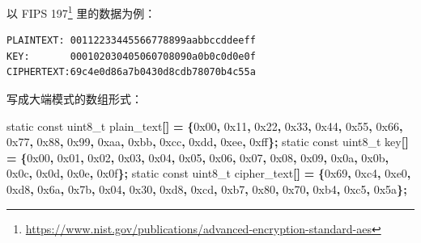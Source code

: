 \documentclass[
  12pt,
]{book}
\newenvironment{Shaded}{\begin{snugshade}}{\end{snugshade}}
\newcommand{\BaseNTok}[1]{\textcolor[rgb]{0.00,0.00,0.81}{#1}}
\newcommand{\DataTypeTok}[1]{\textcolor[rgb]{0.13,0.29,0.53}{#1}}
\newcommand{\NormalTok}[1]{#1}
\newcommand{\OperatorTok}[1]{\textcolor[rgb]{0.81,0.36,0.00}{\textbf{#1}}}
\renewcommand{\href}[2]{#2\footnote{\url{#1}}}
\begin{document}
以 \href{https://www.nist.gov/publications/advanced-encryption-standard-aes}{FIPS 197}
里的数据为例：

\begin{verbatim}
PLAINTEXT: 00112233445566778899aabbccddeeff
KEY:       000102030405060708090a0b0c0d0e0f
CIPHERTEXT:69c4e0d86a7b0430d8cdb78070b4c55a
\end{verbatim}

写成大端模式的数组形式：

\begin{Shaded}
\begin{Highlighting}[]
\DataTypeTok{static} \DataTypeTok{const} \DataTypeTok{uint8\_t}\NormalTok{ plain\_text}\OperatorTok{[]} \OperatorTok{=}
    \OperatorTok{\{}\BaseNTok{0x00}\OperatorTok{,} \BaseNTok{0x11}\OperatorTok{,} \BaseNTok{0x22}\OperatorTok{,} \BaseNTok{0x33}\OperatorTok{,} \BaseNTok{0x44}\OperatorTok{,} \BaseNTok{0x55}\OperatorTok{,} \BaseNTok{0x66}\OperatorTok{,} \BaseNTok{0x77}\OperatorTok{,}
     \BaseNTok{0x88}\OperatorTok{,} \BaseNTok{0x99}\OperatorTok{,} \BaseNTok{0xaa}\OperatorTok{,} \BaseNTok{0xbb}\OperatorTok{,} \BaseNTok{0xcc}\OperatorTok{,} \BaseNTok{0xdd}\OperatorTok{,} \BaseNTok{0xee}\OperatorTok{,} \BaseNTok{0xff}\OperatorTok{\};}
\DataTypeTok{static} \DataTypeTok{const} \DataTypeTok{uint8\_t}\NormalTok{ key}\OperatorTok{[]} \OperatorTok{=}
    \OperatorTok{\{}\BaseNTok{0x00}\OperatorTok{,} \BaseNTok{0x01}\OperatorTok{,} \BaseNTok{0x02}\OperatorTok{,} \BaseNTok{0x03}\OperatorTok{,} \BaseNTok{0x04}\OperatorTok{,} \BaseNTok{0x05}\OperatorTok{,} \BaseNTok{0x06}\OperatorTok{,} \BaseNTok{0x07}\OperatorTok{,}
     \BaseNTok{0x08}\OperatorTok{,} \BaseNTok{0x09}\OperatorTok{,} \BaseNTok{0x0a}\OperatorTok{,} \BaseNTok{0x0b}\OperatorTok{,} \BaseNTok{0x0c}\OperatorTok{,} \BaseNTok{0x0d}\OperatorTok{,} \BaseNTok{0x0e}\OperatorTok{,} \BaseNTok{0x0f}\OperatorTok{\};}
\DataTypeTok{static} \DataTypeTok{const} \DataTypeTok{uint8\_t}\NormalTok{ cipher\_text}\OperatorTok{[]} \OperatorTok{=}
    \OperatorTok{\{}\BaseNTok{0x69}\OperatorTok{,} \BaseNTok{0xc4}\OperatorTok{,} \BaseNTok{0xe0}\OperatorTok{,} \BaseNTok{0xd8}\OperatorTok{,} \BaseNTok{0x6a}\OperatorTok{,} \BaseNTok{0x7b}\OperatorTok{,} \BaseNTok{0x04}\OperatorTok{,} \BaseNTok{0x30}\OperatorTok{,}
     \BaseNTok{0xd8}\OperatorTok{,} \BaseNTok{0xcd}\OperatorTok{,} \BaseNTok{0xb7}\OperatorTok{,} \BaseNTok{0x80}\OperatorTok{,} \BaseNTok{0x70}\OperatorTok{,} \BaseNTok{0xb4}\OperatorTok{,} \BaseNTok{0xc5}\OperatorTok{,} \BaseNTok{0x5a}\OperatorTok{\};}
\end{Highlighting}
\end{Shaded}
\end{document}
